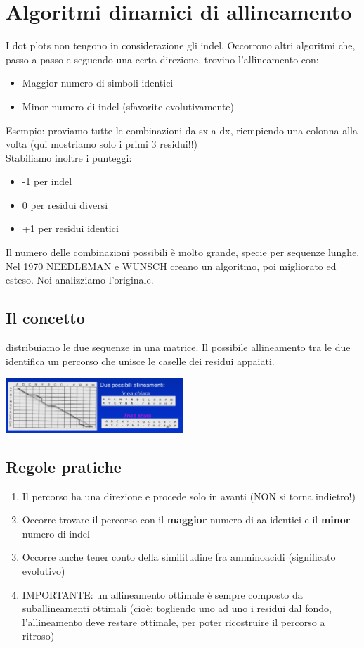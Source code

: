 \documentclass{article}
\begin{document}
\section{Algoritmi dinamici di allineamento}
I dot plots non tengono in considerazione gli indel. Occorrono altri
algoritmi che, passo a passo e seguendo una certa direzione, trovino
l’allineamento con:
\begin{itemize}
    \item Maggior numero di simboli identici
    \item Minor numero di indel (sfavorite evolutivamente)
\end{itemize}
Esempio: proviamo tutte le combinazioni da sx a dx, riempiendo una colonna alla volta (qui mostriamo solo i primi 3 residui!!)\\
Stabiliamo inoltre i punteggi:
\begin{itemize}
    \item -1 per indel
    \item 0 per residui diversi
    \item +1 per residui identici
\end{itemize}
Il numero delle combinazioni possibili è molto grande, specie per
sequenze lunghe. Nel 1970 NEEDLEMAN e WUNSCH creano un algoritmo, poi
migliorato ed esteso. Noi analizziamo l’originale.
\subsection{Il concetto}
distribuiamo le due sequenze in una matrice. Il possibile
allineamento tra le due identifica un percorso che unisce le caselle dei
residui appaiati.
\begin{center}
    \includegraphics[width=0.5\textwidth]{figures/algo.png}
\end{center}
\subsection{Regole pratiche}
\begin{enumerate}
    \item Il percorso ha una direzione e procede solo in avanti (NON si torna indietro!)
    \item Occorre trovare il percorso con il \textbf{maggior} numero di aa identici e il \textbf{minor} numero di indel
    \item Occorre anche tener conto della similitudine fra amminoacidi (significato evolutivo)
    \item IMPORTANTE: un allineamento ottimale è sempre
    composto da suballineamenti ottimali (cioè: togliendo uno
    ad uno i residui dal fondo, l’allineamento deve restare
    ottimale, per poter ricostruire il percorso a ritroso)
\end{enumerate}
\end{document}
